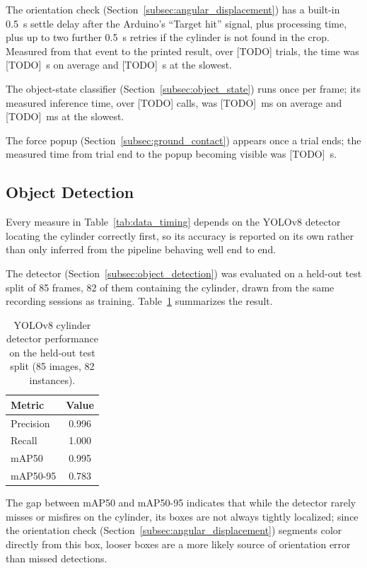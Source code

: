 The orientation check (Section~\ref{subsec:angular_displacement}) has
a built-in 0.5~s settle delay after the Arduino's ``Target hit''
signal, plus processing time, plus up to two further 0.5~s retries if
the cylinder is not found in the crop. Measured from that event to the
printed result, over [TODO] trials, the time was [TODO]~s on average
and [TODO]~s at the slowest.

The object-state classifier (Section~\ref{subsec:object_state}) runs
once per frame; its measured inference time, over [TODO] calls, was
[TODO]~ms on average and [TODO]~ms at the slowest.

The force popup (Section~\ref{subsec:ground_contact}) appears once a
trial ends; the measured time from trial end to the popup becoming
visible was [TODO]~s.

\subsection{Object Detection}
\label{subsec:results_detection}

Every measure in Table~\ref{tab:data_timing} depends on the YOLOv8
detector locating the cylinder correctly first, so its accuracy is
reported on its own rather than only inferred from the pipeline
behaving well end to end.

The detector (Section~\ref{subsec:object_detection}) was evaluated on
a held-out test split of 85 frames, 82 of them containing the
cylinder, drawn from the same recording sessions as training.
Table~\ref{tab:detector_performance} summarizes the result.

\begin{table}[h]
\centering
\begin{tabular}{lc}
\hline
Metric & Value \\
\hline
Precision & 0.996 \\
Recall & 1.000 \\
mAP50 & 0.995 \\
mAP50-95 & 0.783 \\
\hline
\end{tabular}
\caption{YOLOv8 cylinder detector performance on the held-out test
split (85 images, 82 instances).}
\label{tab:detector_performance}
\end{table}

The gap between mAP50 and mAP50-95 indicates that while the detector
rarely misses or misfires on the cylinder, its boxes are not always
tightly localized; since the orientation check
(Section~\ref{subsec:angular_displacement}) segments color directly
from this box, looser boxes are a more likely source of orientation
error than missed detections.

